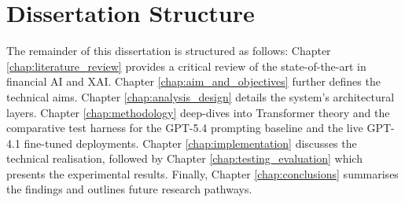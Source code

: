 \section{Dissertation Structure}
The remainder of this dissertation is structured as follows: Chapter \ref{chap:literature_review} provides a critical review of the state-of-the-art in financial AI and XAI. Chapter \ref{chap:aim_and_objectives} further defines the technical aims. Chapter \ref{chap:analysis_design} details the system's architectural layers. Chapter \ref{chap:methodology} deep-dives into Transformer theory and the comparative test harness for the GPT-5.4 prompting baseline and the live GPT-4.1 fine-tuned deployments. Chapter \ref{chap:implementation} discusses the technical realisation, followed by Chapter \ref{chap:testing_evaluation} which presents the experimental results. Finally, Chapter \ref{chap:conclusions} summarises the findings and outlines future research pathways.
 
